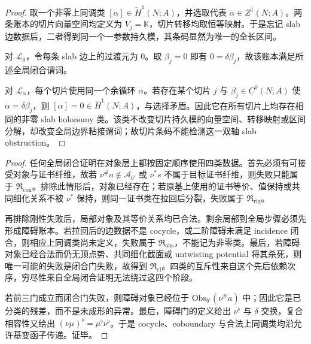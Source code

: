 \begin{proof}
取一个非零上同调类 \([\alpha]\in\check H^1(N;A)\)，并选取代表 \(\alpha\in Z^1(N;A)\)。两条账本的切片向量空间均定义为 \(V_j=\mathbb K\)，切片转移均取恒等映射。于是忘记 slab 边数据后，二者得到同一个一参数持久模，其条码显然为唯一的全长区间。

对 \(\mathcal L_0\)，令每条 slab 边上的过渡元为 \(0\)。取 \(\beta_j=0\) 即有 \(0=\delta\beta_j\)，故该账本满足所述全局闭合谓词。

对 \(\mathcal L_\alpha\)，每个切片使用同一个余循环 \(\alpha\)。若存在某个切片 \(j\) 与 \(\beta_j\in C^0(N;A)\) 使 \(\alpha=\delta\beta_j\)，则 \([\alpha]=0\in\check H^1(N;A)\)，与选择矛盾。因此它在所有切片上均存在相同的非零 slab holonomy 类。该类不改变切片持久模的向量空间、转移映射或区间分解，却改变全局边界粘接谓词；故切片条码不能检测这一双轴 slab obstruction。
\end{proof}

\begin{proof}
任何全局闭合证明在对象层上都按固定顺序使用四类数据。首先必须有可接受对象与证书纤维，故若 \(\nu^\#a\notin\mathcal A_{b'}\) 或 \(\nu^*s\) 不属于目标证书纤维，则失败只能属于 \(\mathfrak R_{\mathrm{con}}\)。排除此情形后，对象已经存在；若原基上使用的证书等价、值保持或共同细化关系不被 \(\nu^*\) 保持，则同一证书类在拉回后分裂，失败属于 \(\mathfrak R_{\mathrm{rig}}\)。

再排除刚性失败后，局部对象及其等价关系均已合法。剩余局部到全局步骤必须先形成障碍账本。若拉回后的边数据不是 cocycle，或二阶障碍未满足 incidence 闭合，则相应上同调类尚未定义，失败属于 \(\mathfrak R_{\mathrm{obs}}\)，不能记为非零类。最后，若障碍对象已经合法而仍无顶点势、共同细化截面或 untwisting potential 将其杀死，则唯一可能的失败是闭合门失败，故得到 \(\mathfrak R_{\mathrm{cl}}\)。四类的互斥性来自这个先后依赖次序，穷尽性来自全局闭合证明无法绕过这四个阶段。

若前三门成立而闭合门失败，则障碍对象已经位于 \(\mathrm{Obs}_{b'}(\nu^\#a)\) 中；因此它是已分类的残差，而不是未成形的异常。最后，障碍门的定义给出 \(\nu^\flat\) 与 \(\delta\) 交换，复合相容性又给出 \((\nu\mu)^\flat=\mu^\flat\nu^\flat\)。于是 cocycle、coboundary 与合法上同调类均沿允许基变函子传递。证毕。
\end{proof}



